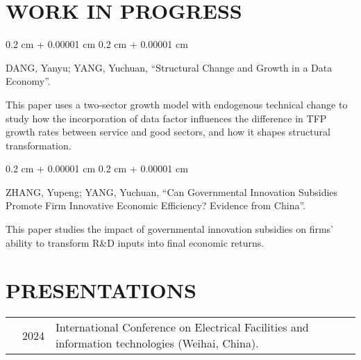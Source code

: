 \documentclass[10pt, letterpaper]{article}
\newenvironment{onecolentry}{
    \begin{adjustwidth}{
        0.2 cm + 0.00001 cm
    }{
        0.2 cm + 0.00001 cm
    }
}{
    \end{adjustwidth}
} %
\newenvironment{paper}{\vspace{.2cm}\begin{samepage}\begin{onecolentry}}{\end{onecolentry}\end{samepage}\vspace{0.2cm}}
\begin{document}
\section{WORK IN PROGRESS}

\begin{paper}
DANG, Yanyu; YANG, Yuchuan, ``Structural Change and Growth in a Data Economy''.

\hspace{1em}
This paper uses a two-sector growth model with endogenous technical change to study how the incorporation of data factor influences the difference in TFP growth rates between service and good sectors, and how it shapes structural transformation.
\end{paper}

\begin{paper}
ZHANG, Yupeng; YANG, Yuchuan, ``Can Governmental Innovation Subsidies Promote Firm Innovative Economic Efficiency? Evidence from China''.

\hspace{1em}
This paper studies the impact of governmental innovation subsidies on firms' ability to transform R\&D inputs into final economic returns.
\end{paper}

%	



\section{PRESENTATIONS}

\vspace{.2cm}
\begin{tabularx}{\textwidth}{@{}p{.2cm} @{}p{1cm} X@{}}
& 2024 & International Conference on Electrical Facilities and information technologies (Weihai, China).
\end{tabularx}
\end{document}
